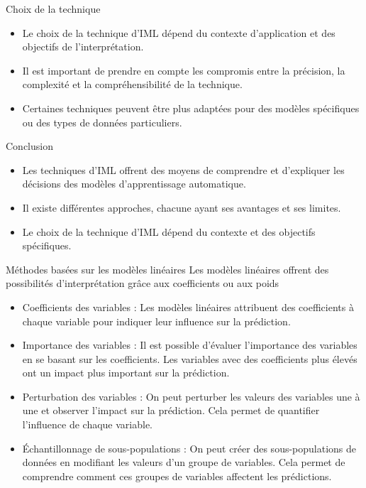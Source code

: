 \documentclass{beamer}
\begin{document}
\begin{frame}{Choix de la technique}
	\begin{itemize}
		\item Le choix de la technique d'IML dépend du contexte d'application et des objectifs de l'interprétation.
		\item Il est important de prendre en compte les compromis entre la précision, la complexité et la compréhensibilité de la technique.
		\item Certaines techniques peuvent être plus adaptées pour des modèles spécifiques ou des types de données particuliers.
	\end{itemize}
Conclusion
    \begin{itemize}
	\item Les techniques d'IML offrent des moyens de comprendre et d'expliquer les décisions des modèles d'apprentissage automatique.
	\item Il existe différentes approches, chacune ayant ses avantages et ses limites.
	\item Le choix de la technique d'IML dépend du contexte et des objectifs spécifiques.
\end{itemize}
\end{frame}

\begin{frame}{Méthodes basées sur les modèles linéaires}
	Les modèles linéaires offrent des possibilités d'interprétation grâce aux coefficients ou aux poids
\begin{itemize}
	\item Coefficients des variables : Les modèles linéaires attribuent des coefficients à chaque variable pour indiquer leur influence sur la prédiction.
	
	\item Importance des variables : Il est possible d'évaluer l'importance des variables en se basant sur les coefficients. Les variables avec des coefficients plus élevés ont un impact plus important sur la prédiction.

		\item Perturbation des variables : On peut perturber les valeurs des variables une à une et observer l'impact sur la prédiction. Cela permet de quantifier l'influence de chaque variable.
		
		\item Échantillonnage de sous-populations : On peut créer des sous-populations de données en modifiant les valeurs d'un groupe de variables. Cela permet de comprendre comment ces groupes de variables affectent les prédictions.

\end{itemize}		
\end{frame}
\end{document}
